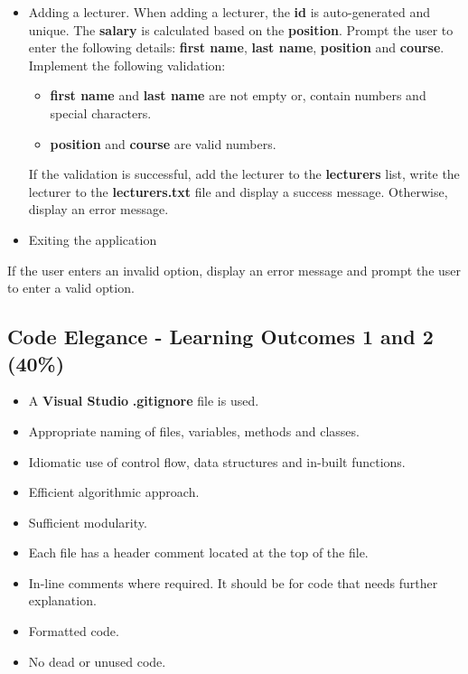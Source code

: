 \documentclass{article}
\begin{document}
\begin{itemize}
\begin{itemize}
\begin{itemize}
\begin{itemize}
            \end{itemize}
            \item Adding a lecturer. When adding a lecturer, the \textbf{id} is auto-generated and unique. The \textbf{salary} is calculated based on the \textbf{position}. Prompt the user to enter the following details: \textbf{first name}, \textbf{last name}, \textbf{position} and \textbf{course}. Implement the following validation:
            \begin{itemize}
                \item \textbf{first name} and \textbf{last name} are not empty or, contain numbers and special characters.
                \item \textbf{position} and \textbf{course} are valid numbers.
            \end{itemize}
            If the validation is successful, add the lecturer to the \textbf{lecturers} list, write the lecturer to the \textbf{lecturers.txt} file and display a success message. Otherwise, display an error message.
            \item Exiting the application
        \end{itemize} 
        If the user enters an invalid option, display an error message and prompt the user to enter a valid option.
    \end{itemize}
\end{itemize}

\subsection*{Code Elegance - Learning Outcomes 1 and 2 (40\%)}
\begin{itemize}
    \item A \textbf{Visual Studio} \textbf{.gitignore} file is used. 
    \item Appropriate naming of files, variables, methods and classes.
    \item Idiomatic use of control flow, data structures and in-built functions.
    \item Efficient algorithmic approach.
    \item Sufficient modularity.
    \item Each file has a header comment located at the top of the file.
    \item In-line comments where required. It should be for code that needs further explanation.
    \item Formatted code.
    \item No dead or unused code.
\end{itemize}
\end{document}
